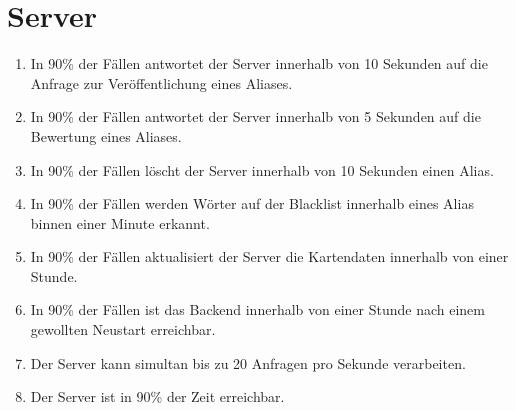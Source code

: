 \section{Server}

\begin{enumerate}
    \item In 90\% der Fällen antwortet der Server innerhalb von 10 Sekunden auf die Anfrage zur Veröffentlichung eines Aliases.
    \item In 90\% der Fällen antwortet der Server innerhalb von 5 Sekunden auf die Bewertung eines Aliases.
    \item In 90\% der Fällen löscht der Server innerhalb von 10 Sekunden einen Alias.
    \item In 90\% der Fällen werden Wörter auf der Blacklist innerhalb eines Alias binnen einer Minute erkannt.
    \item In 90\% der Fällen aktualisiert der Server die Kartendaten innerhalb von einer Stunde.
    \item In 90\% der Fällen ist das Backend innerhalb von einer Stunde nach einem gewollten Neustart erreichbar.
    \item Der Server kann simultan bis zu 20 Anfragen pro Sekunde verarbeiten.
    \item Der Server ist in 90\% der Zeit erreichbar. 
\end{enumerate}